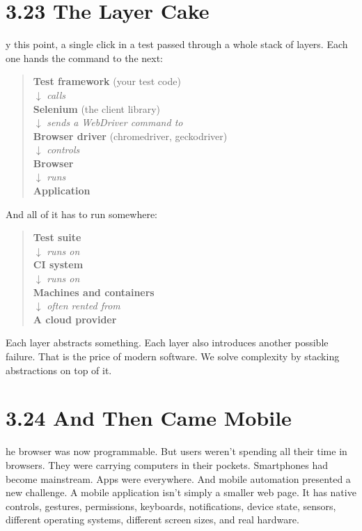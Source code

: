 \documentclass[11pt, a4paper, openany]{book}
\newcommand{\initialcap}[1]{{\fontfamily{lmss}\selectfont\huge\textbf{#1}}}
\begin{document}
\section{3.23 The Layer Cake}
\noindent \initialcap{B}y this point, a single click in a test passed through a whole stack of layers. Each one hands the command to the next:
\begin{quote}
\centering
\textbf{Test framework} (your test code)\\
$\downarrow$ \textit{calls}\\
\textbf{Selenium} (the client library)\\
$\downarrow$ \textit{sends a WebDriver command to}\\
\textbf{Browser driver} (chromedriver, geckodriver)\\
$\downarrow$ \textit{controls}\\
\textbf{Browser}\\
$\downarrow$ \textit{runs}\\
\textbf{Application}
\end{quote}
And all of it has to run somewhere:
\begin{quote}
\centering
\textbf{Test suite}\\
$\downarrow$ \textit{runs on}\\
\textbf{CI system}\\
$\downarrow$ \textit{runs on}\\
\textbf{Machines and containers}\\
$\downarrow$ \textit{often rented from}\\
\textbf{A cloud provider}
\end{quote}
Each layer abstracts something. Each layer also introduces another possible failure. That is the price of modern software. We solve complexity by stacking abstractions on top of it.

\section{3.24 And Then Came Mobile}
\noindent \initialcap{T}he browser was now programmable. But users weren't spending all their time in browsers. They were carrying computers in their pockets. Smartphones had become mainstream. Apps were everywhere. And mobile automation presented a new challenge. A mobile application isn't simply a smaller web page. It has native controls, gestures, permissions, keyboards, notifications, device state, sensors, different operating systems, different screen sizes, and real hardware. 
\end{document}

